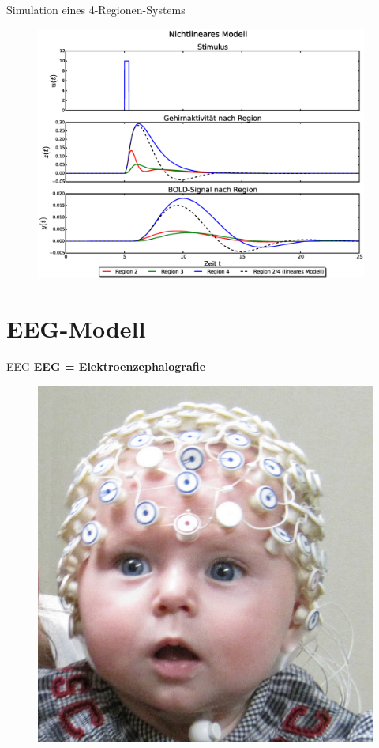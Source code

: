 \documentclass{beamer}
\begin{document}
\begin{frame}{Simulation eines 4-Regionen-Systems}
	\begin{figure}
		\vspace*{-0.33cm}
		\centering
		\includegraphics[width=0.975\textwidth]{res/hemodynamicExample-4R-vgllinear.eps}
	\end{figure}
\end{frame}

\section{EEG-Modell}
\begin{frame}{EEG}
\textbf{EEG = Elektroenzephalografie}
\begin{figure}
\centering
\includegraphics[scale=0.3]{res/EEGbaby.png}
\end{figure}
\end{frame}
\end{document}
